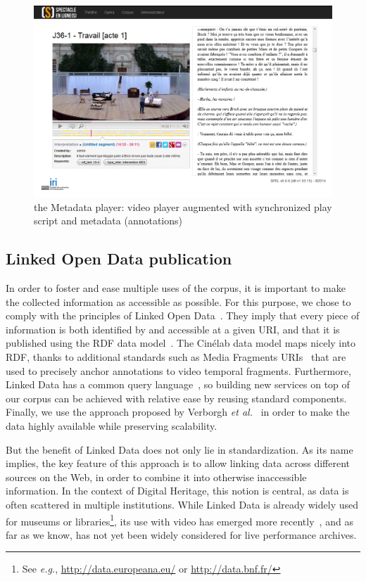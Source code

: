 \documentclass[conference]{IEEEtran}
\begin{document}
\begin{figure}[htb!]
  \centering
  \includegraphics[width=\columnwidth]{mdplayer}
  \caption{the Metadata player: video player augmented with synchronized play script and metadata (annotations)}
  \label{fig:mdplayer}
\end{figure}

\subsection{Linked Open Data publication}
In order to foster and ease multiple uses of the corpus,
it is important to make the collected information as accessible as possible.
For this purpose, we chose to comply with the principles of Linked Open Data~\cite{bernerslee2006linkeddata}.
They imply that every piece of information is both identified by and accessible at a given URI, and that it is published using the RDF data model~\cite{cyganiak2014rdf11concepts}.
The Cinélab data model maps nicely into RDF, thanks to additional standards such as Media Fragments URIs~\cite{troncy2012mediafragments} that are used to precisely anchor annotations to video temporal fragments. Furthermore, Linked Data has a common query language~\cite{prudhommeaux2008sparql}, so building new services on top of our corpus can be achieved with relative ease by reusing standard components. Finally, we use the approach proposed by Verborgh \emph{et al.}~\cite{verborgh2014querying} in order to make the data highly available while preserving scalability.

But the benefit of Linked Data does not only lie in standardization.
As its name implies, the key feature of this approach is to allow linking data across different sources on the Web, in order to combine it into otherwise inaccessible information.
In the context of Digital Heritage, this notion is central, as data is often scattered in multiple institutions.
While Linked Data is already widely used for museums or libraries\footnote{
See \emph{e.g.}, \url{http://data.europeana.eu/} or \url{http://data.bnf.fr/}},
its use with video has emerged more recently~\cite{vandeursen2012mediafragmentannotations,steiner2014webvtt},
and as far as we know, has not yet been widely considered for live performance archives.
\end{document}
